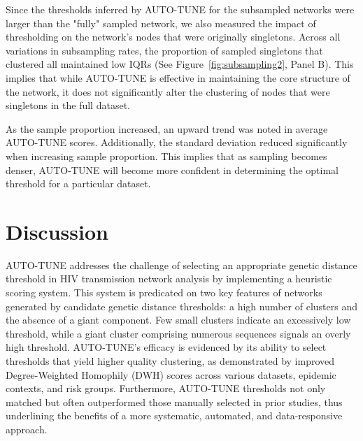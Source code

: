 \documentclass[utf8]{FrontiersinHarvard} %
\newcommand{\TODO}[1]{{\color{red}{#1}}}
\begin{document}
Since the thresholds inferred by AUTO-TUNE for the subsampled networks were
larger than the "fully" sampled network, we also measured the impact of
thresholding on the network's nodes that were originally singletons. Across all
variations in subsampling rates, the proportion of sampled singletons that
clustered all maintained low IQRs (See Figure~\ref{fig:subsampling2}, Panel B).
This implies that while AUTO-TUNE is effective in maintaining the core
structure of the network, it does not significantly alter the clustering of
nodes that were singletons in the full dataset.

As the sample proportion increased, an upward trend was noted in average
AUTO-TUNE scores. Additionally, the standard deviation reduced significantly
when increasing sample proportion. This implies that as sampling becomes
denser, AUTO-TUNE will become more confident in determining the optimal
threshold for a particular dataset.

\section{Discussion}

\TODO{NEEDS REVIEW}


AUTO-TUNE addresses the challenge of selecting an appropriate genetic distance
threshold in HIV transmission network analysis by implementing a heuristic
scoring system. This system is predicated on two key features of networks
generated by candidate genetic distance thresholds: a high number of clusters
and the absence of a giant component. Few small clusters indicate an
excessively low threshold, while a giant cluster comprising numerous sequences
signals an overly high threshold. AUTO-TUNE's efficacy is evidenced by its
ability to select thresholds that yield higher quality clustering, as
demonstrated by improved Degree-Weighted Homophily (DWH) scores across various
datasets, epidemic contexts, and risk groups. Furthermore, AUTO-TUNE thresholds
not only matched but often outperformed those manually selected in prior
studies, thus underlining the benefits of a more systematic, automated, and
data-responsive approach.
\end{document}
